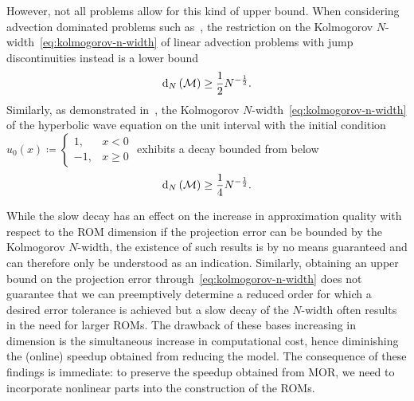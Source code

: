 However, not all problems allow for this kind of upper bound.
When considering advection dominated problems such as~\cite[Section~5.1]{Ohlberger2016}, the restriction on the Kolmogorov $N$-width~\eqref{eq:kolmogorov-n-width} of linear advection problems with jump discontinuities instead is a lower bound
\begin{equation*}
    \mathop{}\!\mathrm{d}_N\left(\mathcal{M}\right) \geq \frac{1}{2} N^{- \frac{1}{2}}.
\end{equation*}
Similarly, as demonstrated in~\cite{Greif2019}, the Kolmogorov $N$-width~\eqref{eq:kolmogorov-n-width} of the hyperbolic wave equation on the unit interval with the initial condition $u_0(x) \coloneqq \begin{cases}
    1, & x < 0 \\
    -1, & x \geq 0
\end{cases}$ exhibits a decay bounded from below
\begin{equation*}
    \mathop{}\!\mathrm{d}_N\left(\mathcal{M}\right) \geq \frac{1}{4} N^{- \frac{1}{2}}.
\end{equation*}

While the slow decay has an effect on the increase in approximation quality with respect to the \ac{ROM} dimension if the projection error can be bounded by the Kolmogorov $N$-width, the existence of such results is by no means guaranteed and can therefore only be understood as an indication.
Similarly, obtaining an upper bound on the projection error through~\eqref{eq:kolmogorov-n-width} does not guarantee that we can preemptively determine a reduced order for which a desired error tolerance is achieved but a slow decay of the $N$-width often results in the need for larger \acp{ROM}.
The drawback of these bases increasing in dimension is the simultaneous increase in computational cost, hence diminishing the (online) speedup obtained from reducing the model.
The consequence of these findings is immediate: to preserve the speedup obtained from \ac{MOR}, we need to incorporate nonlinear parts into the construction of the \acp{ROM}.
